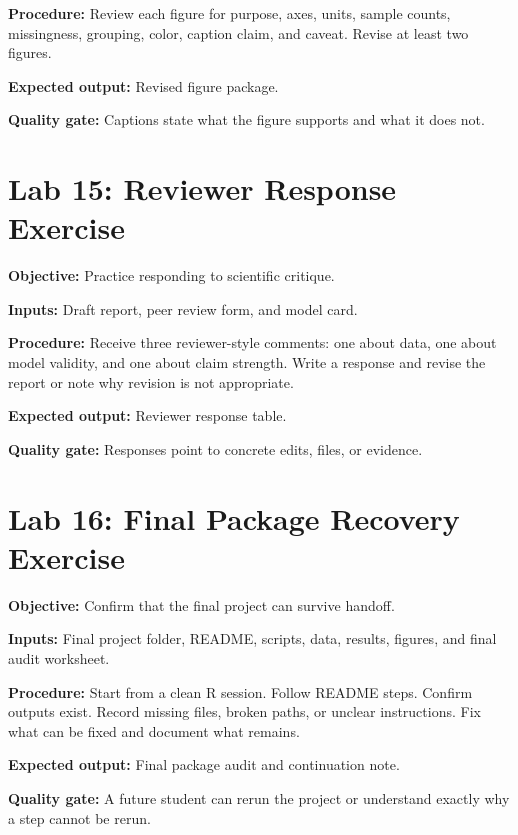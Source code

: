 \textbf{Procedure:} Review each figure for purpose, axes, units, sample counts, missingness, grouping, color, caption claim, and caveat. Revise at least two figures.

\textbf{Expected output:} Revised figure package.

\textbf{Quality gate:} Captions state what the figure supports and what it does not.

\section{Lab 15: Reviewer Response Exercise}
\textbf{Objective:} Practice responding to scientific critique.

\textbf{Inputs:} Draft report, peer review form, and model card.

\textbf{Procedure:} Receive three reviewer-style comments: one about data, one about model validity, and one about claim strength. Write a response and revise the report or note why revision is not appropriate.

\textbf{Expected output:} Reviewer response table.

\textbf{Quality gate:} Responses point to concrete edits, files, or evidence.

\section{Lab 16: Final Package Recovery Exercise}
\textbf{Objective:} Confirm that the final project can survive handoff.

\textbf{Inputs:} Final project folder, README, scripts, data, results, figures, and final audit worksheet.

\textbf{Procedure:} Start from a clean R session. Follow README steps. Confirm outputs exist. Record missing files, broken paths, or unclear instructions. Fix what can be fixed and document what remains.

\textbf{Expected output:} Final package audit and continuation note.

\textbf{Quality gate:} A future student can rerun the project or understand exactly why a step cannot be rerun.

